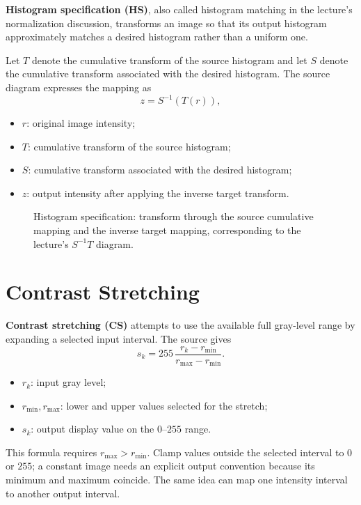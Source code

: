 \documentclass[11pt,a4paper,oneside]{report}
\newcommand{\mathlegend}[1]{%
  \par\vspace{0.2em}{\small\itshape where}\par
  \begin{itemize}[leftmargin=1.7em,topsep=0.15em,itemsep=0.12em]
  #1
  \end{itemize}
}
\begin{document}
\textbf{Histogram specification (HS)}, also called histogram matching in the lecture's normalization discussion, transforms an image so that its output histogram approximately matches a desired histogram rather than a uniform one.

Let $T$ denote the cumulative transform of the source histogram and let $S$ denote the cumulative transform associated with the desired histogram. The source diagram expresses the mapping as
\begin{equation}
  z=S^{-1}\!\left(T(r)\right),
  \label{eq:hist-specification}
\end{equation}
\mathlegend{
  \item $r$: original image intensity;
  \item $T$: cumulative transform of the source histogram;
  \item $S$: cumulative transform associated with the desired histogram;
  \item $z$: output intensity after applying the inverse target transform.
}

\begin{figure}[!htbp]
\centering
{}
\caption{Histogram specification: transform through the source cumulative mapping and the inverse target mapping, corresponding to the lecture's $S^{-1}T$ diagram.}
\label{fig:hist-specification-flow}
\end{figure}

\section{Contrast Stretching}

\textbf{Contrast stretching (CS)} attempts to use the available full gray-level range by expanding a selected input interval. The source gives
\begin{equation}
  s_k=255\,\frac{r_k-r_{\min}}{r_{\max}-r_{\min}}.
  \label{eq:contrast-stretching}
\end{equation}
\mathlegend{
  \item $r_k$: input gray level;
  \item $r_{\min},r_{\max}$: lower and upper values selected for the stretch;
  \item $s_k$: output display value on the $0$--$255$ range.
}
This formula requires $r_{\max}>r_{\min}$. Clamp values outside the selected interval to $0$ or $255$; a constant image needs an explicit output convention because its minimum and maximum coincide. The same idea can map one intensity interval to another output interval.
\end{document}
